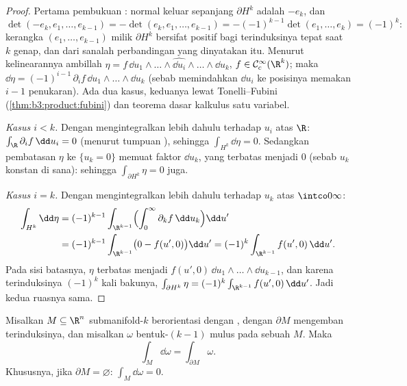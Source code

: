 \begin{proof}
Pertama pembukuan : normal keluar sepanjang
$\partial H^k$ adalah $-e_k$, dan
\[
\det(-e_k, e_1, \dots, e_{k-1}) =
-\det(e_k, e_1, \dots, e_{k-1}) = -(-1)^{k-1}\det(e_1,
\dots, e_k) = (-1)^k :
\]
kerangka $(e_1, \dots, e_{k-1})$ milik $\partial H^k$ bersifat
positif bagi  terinduksinya tepat saat $k$
genap, dan dari sanalah perbandingan yang dinyatakan itu. Menurut kelinearannya ambillah $\eta
= f\,\dd u_1\wedge\dots\wedge\widehat{\dd
u_i}\wedge\dots\wedge\dd u_k$, $f \in \mathcal
C^\infty_c(\R^k)$; maka $\dd\eta =
(-1)^{i-1}\,\partial_if\,\dd u_1\wedge\dots\wedge\dd u_k$
(sebab memindahkan $\dd u_i$ ke posisinya memakan $i - 1$ penukaran). Ada dua
kasus, keduanya lewat Tonelli--Fubini
(\cref{thm:b3:product:fubini}) dan teorema dasar kalkulus
satu variabel.

\emph{Kasus $i < k$.} Dengan mengintegralkan lebih dahulu terhadap $u_i$ atas $\R$:
$\int_\R\partial_if\,\dd u_i = 0$ (menurut tumpuan ), sehingga
$\int_{H^k}\dd\eta = 0$. Sedangkan pembatasan $\eta$ ke
$\{u_k = 0\}$ memuat faktor $\dd u_k$, yang terbatas
menjadi $0$ (sebab $u_k$ konstan di sana): sehingga $\int_{\partial H^k}\eta =
0$ juga.

\emph{Kasus $i = k$.} Dengan mengintegralkan lebih dahulu terhadap $u_k$ atas
$\intco0\infty$:
\begin{align*}
\int_{H^k}\dd\eta &= (-1)^{k-1}\int_{\R^{k-1}}
\Bigl(\int_0^\infty\partial_kf\,\dd u_k\Bigr)\dd u' \\
&= (-1)^{k-1}\int_{\R^{k-1}}\bigl(0 - f(u', 0)\bigr)\dd u'
= (-1)^k\int_{\R^{k-1}}f(u',0)\,\dd u' .
\end{align*}
Pada sisi batasnya, $\eta$ terbatas menjadi $f(u',
0)\,\dd u_1\wedge\dots\wedge\dd u_{k-1}$, dan karena 
terinduksinya $(-1)^k$ kali  bakunya,
$\int_{\partial H^k}\eta =
(-1)^k\int_{\R^{k-1}}f(u',0)\,\dd u'$. Jadi kedua ruasnya sama.
\end{proof}

\begin{theorem}[Stokes]\label{thm:b3:forms:stokes}
Misalkan $M \subseteq \R^n$ submanifold-$k$  berorientasi
dengan , dengan $\partial M$ mengemban 
terinduksinya, dan misalkan $\omega$ bentuk-$(k-1)$ mulus pada sebuah
 $M$. Maka
\[
\int_M\dd\omega = \int_{\partial M}\omega .
\]
Khususnya, jika $\partial M = \varnothing$:
$\int_M\dd\omega = 0$.
\end{theorem}

